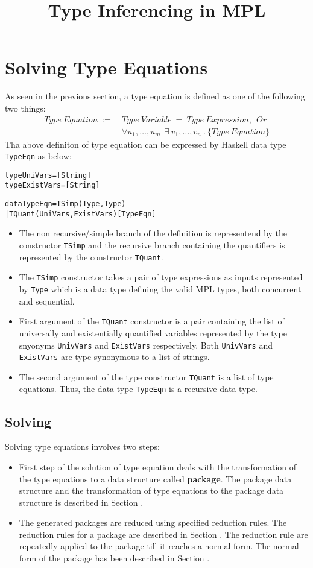 \documentclass[11pt]{article}
\title{Type Inferencing in MPL}
\begin{document}
\maketitle
\section {Solving Type Equations}
As seen in the previous section, a type equation is defined as one of the following two things:
\begin{align*}
 Type~Equation~:=~ 
 & Type~Variable~=~Type~Expression,~~Or\\ 
 & \forall u_1,\ldots,u_m~~\exists~v_1,\ldots,v_n~.~\{Type~Equation\}
\end{align*}
Tha above definiton of type equation can be expressed by Haskell data type \texttt{TypeEqn} as below:
\begin{alltt}
          type UniVars    = [String]
          type ExistVars  = [String]

          data TypeEqn =    TSimp  (Type,Type)
                          | TQuant (UniVars,ExistVars) [TypeEqn] 
\end{alltt}
\begin{itemize}
\item The non recursive/simple branch of the definition is representend by the constructor \texttt{TSimp} and the recursive branch containing the quantifiers is represented by the constructor \texttt{TQuant}. 
\item The \texttt{TSimp} constructor takes a pair of type expressions as inputs represented by \texttt{Type} which is a data type defining the valid MPL types, both concurrent and sequential. 
\item First argument of the \texttt{TQuant} constructor is a pair containing the list of universally and existentially quantified variables represented by the type snyonyms \texttt{UnivVars} and \texttt{ExistVars} respectively. Both \texttt{UnivVars} and \texttt{ExistVars} are type synonymous to a list of strings.
\item The second argument of the type constructor \texttt{TQuant} is a list of type equations. Thus, the data type \texttt{TypeEqn} is a recursive data type.
\end{itemize}

\subsection {Solving}
Solving type equations involves two steps:
\begin{itemize}
    \item First step of the solution of type equation deals with the transformation of the type equations to a data structure called {\bf package}. The package data structure and the transformation of type equations to the package data structure is described in Section .

    \item The generated packages are reduced using specified reduction rules. The reduction rules for a package are described in Section . The reduction rule are repeatedly applied to the package till it reaches a normal form. The normal form of the package has been described in Section .
\end{itemize}
\end{document}
